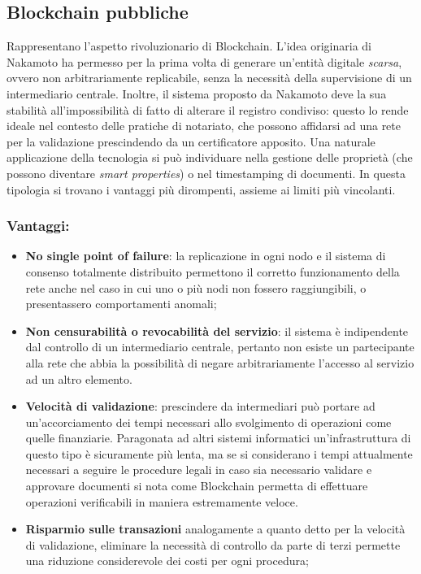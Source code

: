 	\subsection{Blockchain pubbliche}
		Rappresentano l'aspetto rivoluzionario di Blockchain. L'idea originaria di Nakamoto ha permesso per la prima volta di generare un'entità digitale \emph{scarsa}, ovvero non arbitrariamente replicabile, senza la necessità della supervisione di un intermediario centrale. Inoltre, il sistema proposto da Nakamoto deve la sua stabilità all'impossibilità di fatto di alterare il registro condiviso: questo lo rende ideale nel contesto delle pratiche di notariato, che possono affidarsi ad una rete per la validazione prescindendo da un certificatore apposito. Una naturale applicazione della tecnologia si può individuare nella gestione delle proprietà (che possono diventare \emph{smart properties}) o nel timestamping di documenti. In questa tipologia si trovano i vantaggi più dirompenti, assieme ai limiti più vincolanti.
		\subsubsection{Vantaggi:}
			\begin{itemize}
				\item \textbf{No single point of failure}: la replicazione in ogni nodo e il sistema di consenso totalmente distribuito permettono il corretto funzionamento della rete anche nel caso in cui uno o più nodi non fossero raggiungibili, o presentassero comportamenti anomali;
				\item \textbf{Non censurabilità o revocabilità del servizio}: il sistema è indipendente dal controllo di un intermediario centrale, pertanto non esiste un partecipante alla rete che abbia la possibilità di negare arbitrariamente l'accesso al servizio ad un altro elemento.
				\item \textbf{Velocità di validazione}: prescindere da intermediari può portare ad un'accorciamento dei tempi necessari allo svolgimento di operazioni come quelle finanziarie. Paragonata ad altri sistemi informatici un'infrastruttura di questo tipo è sicuramente più lenta, ma se si considerano i tempi attualmente necessari a seguire le procedure legali in caso sia necessario validare e approvare documenti si nota come Blockchain permetta di effettuare operazioni verificabili in maniera estremamente veloce.
				\item \textbf{Risparmio sulle transazioni} analogamente a quanto detto per la velocità di validazione, eliminare la necessità di controllo da parte di terzi permette una riduzione considerevole dei costi per ogni procedura;
			\end{itemize}
